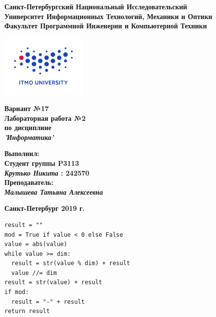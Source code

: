 \documentclass[11pt]{article}
\author{Крутько Никита}
\date{\today}
\title{}
\begin{document}
\begin{center}
\textbf{Санкт-Петербургский Национальный Исследовательский}\\
\textbf{Университет Информационных Технологий, Механики и Оптики}\\
\textbf{Факультет Программной Инженерии и Компьютерной Техники}\\
\end{center}
\vspace{1em}
\begin{center}
\includegraphics[width=120pt]{../itmo-logo.png}
\end{center}
\LARGE
\vspace{5em}
\begin{center}
\textbf{Вариант №17}\\
\textbf{Лабораторная работа №2}\\
\Large
\textbf{по дисциплине}\\
\LARGE
\textbf{\emph{'Информатика'}}\\
\end{center}
\vspace{11em}
\large
\begin{flushright}
\textbf{Выполнил:}\\
\textbf{Студент группы P3113}\\
\textbf{\emph{Крутько Никита} : 242570}\\
\textbf{Преподаватель:}\\
\textbf{\emph{Малышева Татьяна Алексеевна}}\\
\end{flushright}
\vspace{4em}
\large
\begin{center}
\textbf{Санкт-Петербург 2019 г.}
\end{center}
\pagebreak{}
\setcounter{tocdepth}{2}
\tableofcontents
\vspace{2em}
\begin{lstlisting}
result = ""
mod = True if value < 0 else False
value = abs(value)
while value >= dim:
  result = str(value % dim) + result
  value //= dim
result = str(value) + result
if mod:
  result = "-" + result
return result
\end{lstlisting}
\end{document}
